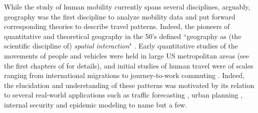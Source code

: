 While the study of human mobility currently spans several disciplines, arguably, geography was the first discipline to analyze mobility data and put forward corresponding theories to describe travel patterns. Indeed, 
the pioneers of quantitative and theoretical geography in the 50's defined ``geography as (the scientific discipline of) \emph{spatial interaction}" \cite{ullman_1980_geography}. Early quantitative studies of the movements of people and vehicles were held in large US metropolitan areas \cite{helvig_1964_chicago} (see the first chapters of  \cite{boyce_2015_forecasting} for details), and initial studies of human travel were of scales ranging from international migrations \cite{reilly_1929_methods,stouffer_1940_intervening,zipf_1946_p1,anderson_1955_intermetropolitan} to journey-to-work commuting \cite{hanson_1980_importance,huff_1986_repetition,kitamura_2000_micro,bhat_2004_comprehensive,pendyala_2005_florida}. Indeed, the elucidation and understanding of these patterns was motivated by its relation to several real-world applications such as traffic forecasting \cite{boyce_2015_forecasting, nagel_1995_emergent, wang_2012_understanding}, urban planning \cite{hillier_2009_metric,kitamura_2000_micro}, internal security \cite{krebs_2002_mapping,clauset_2010_strategic} and epidemic modeling \cite{colizza_2007_modeling,vespignani_2012_modelling,tizzoni_2014_use} to name but a few. 


